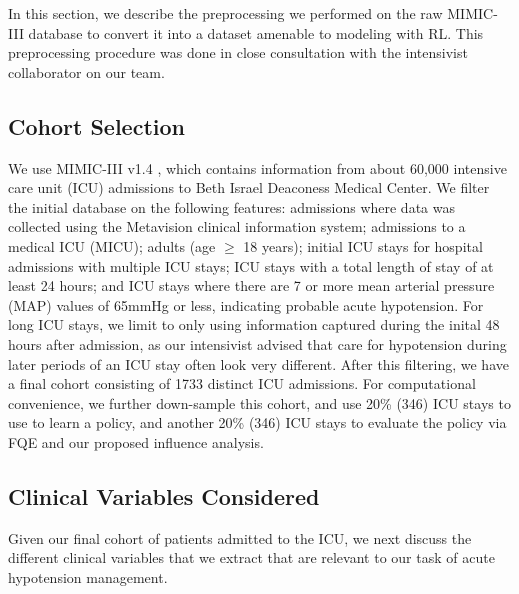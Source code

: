 \documentclass{article}
\begin{document}
In this section, we describe the preprocessing we performed on the raw MIMIC-III database to convert it into a dataset amenable to modeling with RL. This preprocessing procedure was done in close consultation with the intensivist collaborator on our team.

\subsection{Cohort Selection}

We use MIMIC-III v1.4 \citep{johnson2016mimic}, which contains information from about 60,000 intensive care unit (ICU) admissions to Beth Israel Deaconess Medical Center. We filter the initial database on the following features: admissions where data was collected using the Metavision clinical information system; admissions to a medical ICU (MICU); adults (age $\geq$ 18 years); initial ICU stays for hospital admissions with multiple ICU stays; ICU stays with a total length of stay of at least 24 hours; and ICU stays where there are 7 or more mean arterial pressure (MAP) values of 65mmHg or less, indicating probable acute hypotension. For long ICU stays, we limit to only using information captured during the inital 48 hours after admission, as our intensivist advised that care for hypotension during later periods of an ICU stay often look very different. After this filtering, we have a final cohort consisting of 1733 distinct ICU admissions. For computational convenience, we further down-sample this cohort, and use 20\% (346) ICU stays to use to learn a policy, and another 20\% (346) ICU stays to evaluate the policy via FQE and our proposed influence analysis. 

\subsection{Clinical Variables Considered}

Given our final cohort of patients admitted to the ICU, we next discuss the different clinical variables that we extract that are relevant to our task of acute hypotension management. 
\end{document}
